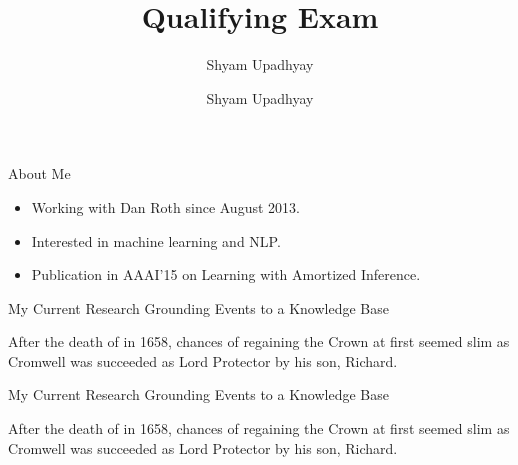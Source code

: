 

\author{Shyam Upadhyay}
\title{Qualifying Exam}

\date{Shyam Upadhyay} 



\begin{frame}
\titlepage
\end{frame}

\begin{frame}{About Me}
\begin{itemize}
\item Working with Dan Roth since August 2013.
\item Interested in machine learning and NLP.
\item Publication in AAAI'15 on Learning with Amortized Inference.
\end{itemize}
\end{frame}

\begin{frame}{My Current Research}
Grounding Events to a Knowledge Base

\begin{block}{}
After the death of  in 1658,  chances of regaining the Crown at first seemed slim as Cromwell was succeeded as Lord Protector by his son, Richard.
\end{block}

\end{frame}

\begin{frame}{My Current Research}
Grounding Events to a Knowledge Base

\begin{block}{}
After the {\color{blue} death of } in 1658,  chances of regaining the Crown at first seemed slim as Cromwell was succeeded as Lord Protector by his son, Richard.
\end{block}

\end{frame}

